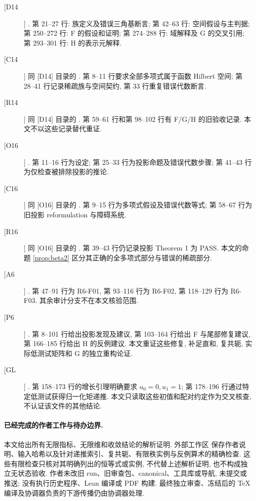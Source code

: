 \documentclass[UTF8,11pt]{ctexart}
\theoremstyle{definition}
\begin{document}
\begin{description}
 \item[[D14]] .
 第 21--27 行: 族定义及错误三角基断言;
 第 42--63 行: 空间假设与主判据;
 第 250--272 行: F 的假设和证明;
 第 274--288 行: 域解释及 G 的交叉引用;
 第 293--301 行: H 的表示元解释.
 \item[[C14]] 同 [D14] 目录的 .
 第 8--11 行要求全部多项式属于函数 Hilbert 空间;
 第 28--41 行记录稀疏族与空间契约, 第 33 行重复错误代数断言.
 \item[[R14]] 同 [D14] 目录的 .
 第 59--61 行和第 98--102 行有 F/G/H 的旧验收记录.
 本文不以这些记录替代重证.
 \item[[O16]] .
 第 11--16 行为设定; 第 25--33 行为投影命题及错误代数步骤;
 第 41--43 行为仅检查被排除投影的推论.
 \item[[C16]] 同 [O16] 目录的 .
 第 9--15 行为多项式假设及错误代数等式;
 第 58--67 行为旧投影 reformulation 与障碍系统.
 \item[[R16]] 同 [O16] 目录的 .
 第 39--43 行仍记录投影 Theorem 1 为 PASS.
 本文的命题 \ref{prop:beta2} 区分其正确的全多项式部分与错误的稀疏部分.
 \item[[A6]] .
 第 47--91 行为 R6-F01, 第 93--116 行为 R6-F02,
 第 118--129 行为 R6-F03. 其余审计分支不在本文核验范围.
 \item[[P6]] .
 第 8--101 行给出投影发现及建议, 第 103--164 行给出 F 与尾部修复建议,
 第 166--185 行给出 H 的反例建议.
 本文重证这些修复, 补足直和, 复共轭, 实际低测试矩阵和 G 的独立重构论证.
 \item[[GL]] .
 第 158--173 行的增长引理明确要求 $u_0=0,u_1=1$;
 第 178--196 行通过特定低测试获得归一化矩递推.
 本文只读取这些初值和配对约定作为交叉核查, 不认证该文件的其他结论.
\end{description}

\paragraph{已经完成的作者工作与待办边界.}
本文给出所有无限指标、无限维和收敛结论的解析证明.
外部工作区 
保存作者说明、输入哈希以及针对递推索引、复共轭、有限秩实例与反例算术的精确检查.
这些有限检查只核对其明确列出的恒等式或实例, 不代替上述解析证明,
也不构成独立无状态验收.
作者未改旧 run、旧审查包、canonical、工具库或导航, 未提交或推送;
没有执行历史程序、Lean 编译或 PDF 构建.
最终独立审查、冻结后的 TeX 编译及协调器负责的下游传播仍由协调器处理.
\end{document}
